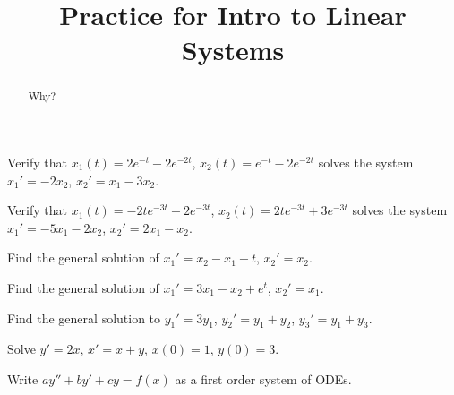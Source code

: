 \documentclass{ximera}
\title{Practice for Intro to Linear Systems}
\begin{document}
\begin{abstract}
Why?
\end{abstract}
\maketitle


\begin{exercise}
    Verify that $x_1(t) = 2e^{-t} - 2e^{-2t}$, $x_2(t) = e^{-t} - 2e^{-2t}$ solves the system $x_1' = - 2x_2 $, $x_2' = x_1 - 3x_2$.  
\end{exercise}

\begin{exercise}
    Verify that $x_1(t) = -2te^{-3t} - 2e^{-3t}$, $x_2(t) = 2te^{-3t} + 3e^{-3t}$ solves the system $x_1' = -5x_1 - 2x_2 $, $x_2' = 2x_1 - x_2$.  
\end{exercise}

\begin{exercise}
    Find the general solution of $x_1' = x_2 - x_1 + t$, $x_2' = x_2$.
\end{exercise}

\begin{exercise}
    Find the general solution of $x_1' = 3 x_1 - x_2 + e^t$, $x_2' = x_1$.
\end{exercise}

\begin{exercise}%
    Find the general solution to $y_1' = 3 y_1$, $y_2' = y_1 + y_2$, $y_3' = y_1 + y_3$.
\end{exercise}

\begin{exercise}%
    Solve $y'=2x$, $x'=x+y$, $x(0)=1$, $y(0)=3$.
\end{exercise}


\begin{exercise}
    Write $ay'' + by' + cy = f(x)$ as a first order system of ODEs.
\end{exercise}
\end{document}
